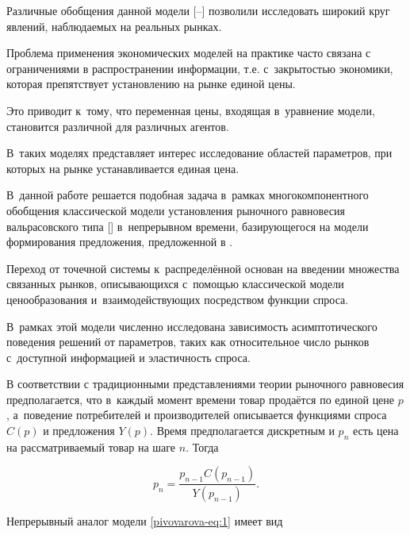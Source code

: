 Различные обобщения данной модели \mbox{[--]} позволили исследовать широкий круг явлений, наблюдаемых на реальных рынках. 

Проблема применения экономических моделей на практике часто связана с ограничениями в распространении информации, т.е. с~закрытостью экономики, которая препятствует установлению на рынке единой цены. 

Это приводит к~тому, что переменная цены, входящая в~уравнение модели, становится различной для различных агентов. 

В~таких моделях представляет интерес исследование областей параметров, при которых на рынке устанавливается единая цена. 

В~данной работе решается подобная задача в~рамках многокомпонентного обобщения классической модели установления рыночного равновесия вальрасовского типа  [] в~непрерывном времени, базирующегося на модели формирования предложения, предложенной в \cite{pivovarova:5}. 

Переход от точечной системы к~распределённой основан на введении множества связанных рынков, описывающихся с~помощью классической модели ценообразования и~взаимодействующих посредством функции спроса. 

В~рамках этой модели численно исследована зависимость асимптотического поведения решений от параметров, таких как относительное число рынков с~доступной информацией и эластичность спроса.

 

\pagebreak

 


В соответствии с традиционными представлениями теории рыночного равновесия \cite{pivovarova:2} предполагается, что в~каждый момент времени товар продаётся по единой цене $p$, а~поведение потребителей и производителей описывается функциями спроса $C(p)$ и предложения $Y(p)$. Время предполагается дискретным и $p_{n} $ есть цена на рассматриваемый товар на шаге $n$. Тогда

\begin{equation} 

p_{n} =\frac{p_{n-1} C(p_{n-1} )}{Y(p_{n-1} )} . 

\label{pivovarova-eq:1}  

\end{equation} 

Непрерывный аналог модели \eqref{pivovarova-eq:1} имеет вид

